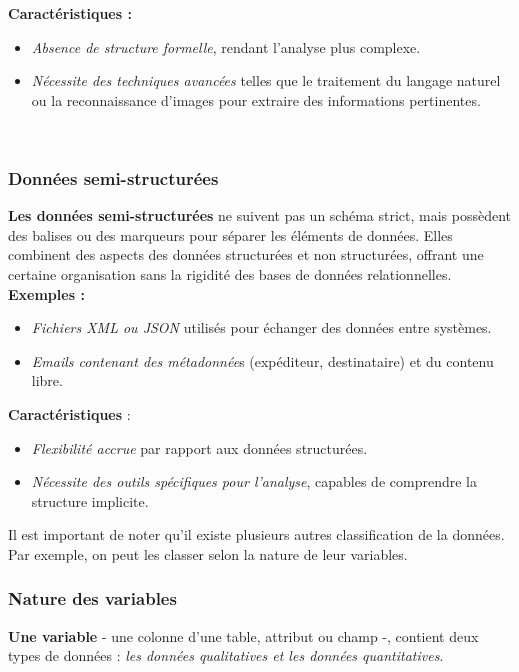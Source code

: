 \documentclass[a4paper,14pt]{article}
\begin{document}
            \textbf{Caractéristiques :}
            \begin{itemize}
                \item \textit{Absence de structure formelle}, rendant l'analyse plus complexe.
                \item \textit{Nécessite des techniques avancées} telles que le traitement du langage naturel ou la reconnaissance d'images pour extraire des informations pertinentes.
            \end{itemize}\\

        \subsubsection{Données semi-structurées}
            \textbf{Les données semi-structurées} ne suivent pas un schéma strict, mais possèdent des balises ou des marqueurs pour séparer les éléments de données. Elles combinent des aspects des données structurées et non structurées, offrant une certaine organisation sans la rigidité des bases de données relationnelles.\\

            \textbf{Exemples :}
            \begin{itemize}
                \item \textit{Fichiers XML ou JSON} utilisés pour échanger des données entre systèmes.
                \item \textit{Emails contenant des métadonnée}s (expéditeur, destinataire) et du contenu libre.
            \end{itemize}
            
            \textbf{Caractéristiques }:
            \begin{itemize}
                \item \textit{Flexibilité accrue} par rapport aux données structurées.
                \item \textit{Nécessite des outils spécifiques pour l'analyse}, capables de comprendre la structure implicite.
            \end{itemize}

            Il est important de noter qu’il existe plusieurs autres classification de la données. Par exemple, on peut les classer selon la nature de leur variables. \\

        \subsubsection{Nature des variables}    
            \textbf{Une variable} - une colonne d'une table, attribut ou champ -, contient deux types de données : \textit{les données qualitatives et les données quantitatives}.\\
\end{document}
